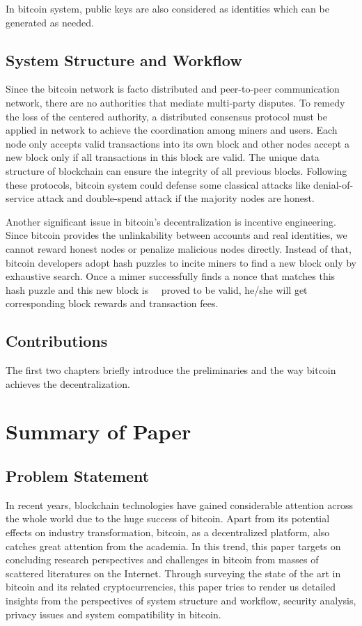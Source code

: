 \documentclass[conference]{IEEEtran}
\begin{document}
In bitcoin system, public keys are also considered as identities which can be generated as needed.

\subsection{System Structure and Workflow}
Since the bitcoin network is facto distributed and peer-to-peer communication network, there are no authorities that mediate multi-party disputes.
%
To remedy the loss of the centered authority, a distributed consensus protocol must be applied in network to achieve the coordination among miners and users.
%
Each node only accepts valid transactions into its own block and other nodes accept a new block only if all transactions in this block are valid.
%
The unique data structure of blockchain can ensure the integrity of all previous blocks. 
%
Following these protocols, bitcoin system could defense some classical attacks like denial-of-service attack and double-spend attack if the majority nodes are honest.

Another significant issue in bitcoin's decentralization is incentive engineering.
%
{\color{red} Since bitcoin provides the unlinkability} between accounts and real identities, we cannot reward honest nodes or penalize malicious nodes directly.
%
Instead of that, bitcoin developers adopt hash puzzles to incite miners to find a new block only by exhaustive search.
%
Once a mimer successfully finds a nonce that matches this hash puzzle and this new block is    proved to be valid, he/she will get corresponding block rewards and transaction fees.

\subsection{Contributions}
The first two chapters briefly introduce the preliminaries and the way bitcoin achieves the decentralization. 


\section{Summary of Paper\cite{bonneau2015sok}}

\subsection{Problem Statement}
In recent years, blockchain technologies have gained considerable attention across the whole world due to the huge success of bitcoin. 
%
Apart from its potential effects on industry transformation, bitcoin, as a decentralized platform, also catches great attention from the academia.
%
In this trend, this paper\cite{bonneau2015sok} targets on concluding research perspectives and challenges in bitcoin from masses of scattered literatures on the Internet.
%
Through surveying the state of the art in bitcoin and its related cryptocurrencies, this paper tries to render us detailed insights from the perspectives of system structure and workflow, security analysis, privacy issues and system compatibility in bitcoin.
\end{document}
